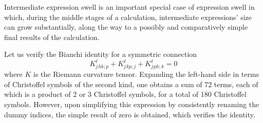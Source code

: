 Intermediate expression swell is an important special case of expression swell in which, during the middle stages of a calculation, intermediate expressions' size can grow substantially, along the way to a possibly and comparatively simple final results of the calculation.
%
\begin{example}
  Let us verify the Bianchi identity for a symmetric connection
  \begin{equation*}
    K^{\ell}_{j}{}_{hk;p} + K^{\ell}_{j}{}_{kp;j} + K^{\ell}_{j}{}_{ph;k} = 0
  \end{equation*}
  where $K$ is the Riemann curvature tensor. Expanding the left-hand side in terms of Christoffel symbols of the second kind, one obtains a sum of 72 terms, each of which is a product of 2 or 3 Christoffel symbols, for a total of 180 Christoffel symbols. However, upon simplifying this expression by consistently renaming the dummy indices, the simple result of zero is obtained, which verifies the identity.

\end{example}
